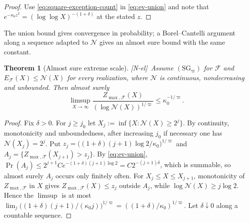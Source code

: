 \documentclass[11pt,reqno]{amsart}
\numberwithin{equation}{section}
\theoremstyle{plain}
\newtheorem{theorem}{Theorem}[section]
\theoremstyle{definition}
\theoremstyle{remark}
\newcommand{\F}{\mathcal{F}}
\newcommand{\tagNE}{\textup{[N-el]}}
\begin{document}
\begin{proof}
Use \eqref{eq:square-exception-count} in \eqref{eq:ev-union} and note that
$e^{-\kappa_0z^2}=(\log\log X)^{-(1+\delta)}$ at the stated $z$.
\end{proof}

The union bound gives convergence in probability; a Borel--Cantelli argument
along a sequence adapted to $\mathcal N$ gives an almost sure bound with the same
constant.

\begin{theorem}[Almost sure extreme scale]
\label{thm:ev-as}
\tagNE\ Assume $(\mathrm{SG}_\varpi)$ for $\F$ and $E_\F(X)\le \mathcal N(X)$ for every realization,
where $\mathcal N$ is continuous, nondecreasing and unbounded. Then almost surely
\begin{equation}
\limsup_{X\to\infty}\frac{Z_{\max,\F}(X)}{(\log \mathcal N(X))^{1/\varpi}}\le \kappa_0^{-1/\varpi}.
\end{equation}
\end{theorem}

\begin{proof}
Fix $\delta>0$. For $j\ge j_0$ let $X_j:=\inf\{X:\mathcal N(X)\ge2^j\}$.
By continuity, monotonicity and unboundedness, after increasing $j_0$ if
necessary one has $\mathcal N(X_j)=2^j$. Put $z_j=\bigl((1+\delta)(j+1)\log2/\kappa_0\bigr)^{1/\varpi}$ and
$A_j=\{Z_{\max,\F}(X_{j+1})>z_j\}$. By \eqref{eq:ev-union},
$\Pr(A_j)\le2^{j+1}Ce^{-(1+\delta)(j+1)\log2}=C2^{-(j+1)\delta}$, which is
summable, so almost surely $A_j$ occurs only finitely often. For
$X_j\le X\le X_{j+1}$, monotonicity of $Z_{\max,\F}$ in $X$ gives
$Z_{\max,\F}(X)\le z_j$ outside $A_j$, while $\log \mathcal N(X)\ge j\log2$. Hence
the $\limsup$ is at most
$\lim_j\bigl((1+\delta)(j+1)/(\kappa_0j)\bigr)^{1/\varpi}=((1+\delta)/\kappa_0)^{1/\varpi}$. Let
$\delta\downarrow0$ along a countable sequence.
\end{proof}
\end{document}
